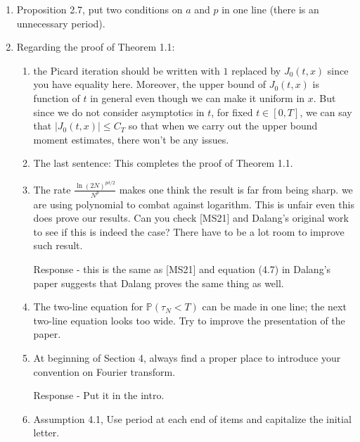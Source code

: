 \documentclass[a4paper,10pt]{article}
\begin{document}
\begin{enumerate}
\begin{enumerate}
     \end{enumerate}
   \item Proposition 2.7, put two conditions on $a$ and $p$ in one line (there is an unnecessary period).
   \item Regarding the proof of Theorem 1.1:
     \begin{enumerate}
       \item the Picard iteration should be written with $1$ replaced by $J_0(t,x)$ since you have equality here.
         Moreover, the upper bound of $J_0(t,x)$ is function of $t$ in general even though we can make it uniform in
         $x$. But since we do not consider asymptotics in $t$, for fixed $t\in [0,T]$, we can say that $|J_0(t,x)|\le
         C_T$ so that when we carry out the upper bound moment estimates, there won't be any issues.
       \item The last sentence: This completes the proof of Theorem 1.1.
       \item The rate $\frac{\ln(2N)^{p\delta/2}}{N^p}$ makes one think the result is far from being sharp. we are using
         polynomial to combat against logarithm. This is unfair even this does prove our results. Can you check [MS21]
         and Dalang's original work to see if this is indeed the case? There have to be a lot room to improve such
         result.

         Response - this is the same as [MS21] and equation (4.7) in Dalang's paper suggests that Dalang proves the same thing as well.
       \item The two-line equation for $\mathbb{P}\left(\tau_N<T\right)$ can be made in one line; the next two-line
         equation looks too wide. Try to improve the presentation of the paper.
       \item At beginning of Section 4, always find a proper place to introduce your convention on Fourier transform.

       Response - Put it in the intro.
       \item Assumption 4.1, Use period at each end of items and capitalize the initial letter.
     \end{enumerate}
\end{enumerate}
\end{document}
